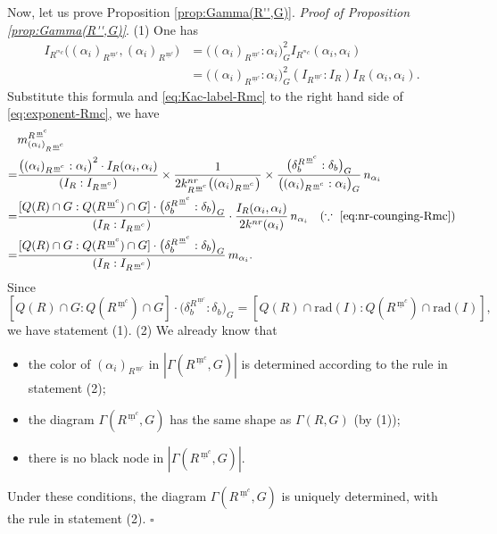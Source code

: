 \documentclass[11pt]{amsart}
\newcommand{\mc}{\, \underline{\mathrm{m}}^c}
\begin{document}
{Now, let us prove Proposition \ref{prop:Gamma(R'',G)}.
\vskip 3mm
\noindent
{\it Proof of Proposition \ref{prop:Gamma(R'',G)}}. 
(1) One has
\begin{align*}
I_{R^{^mc}}\big((\alpha_i)_{R^{\mc}},(\alpha_i)_{R^{\mc}}\big)
&=\big((\alpha_i)_{R^{\mc}}:\alpha_i\big)_G^2I_{R^{^mc}}(\alpha_i,\alpha_i)\\
&=\big((\alpha_i)_{R^{\mc}}:\alpha_i\big)_G^2(I_{R^{\mc}}:I_R)I_R(\alpha_i,\alpha_i).
\end{align*}
Substitute this formula and \eqref{eq:Kac-label-Rmc}
to the right hand side of \eqref{eq:exponent-Rmc}, we have
\begin{align*}
&m_{(\alpha_i)_{R^{\mc}}}^{R^{\mc}} \\
=
&\dfrac{\big((\alpha_i)_{R^{\mc}}:\alpha_i\big)^2 \cdot I_R(\alpha_i,\alpha_i)}
{(I_R:I_{R^{\mc}})}
\times 
\dfrac{1}{2k_{R^{\mc}}^{nr}\big((\alpha_i)_{R^{\mc}}\big)}
\times
\dfrac{\big(\delta_b^{R^{\mc}}:\delta_b\big)_G}
{\big((\alpha_i)_{R^{\mc}}:\alpha_i\big)_G}\, n_{\alpha_i}\\
=
&\dfrac{[Q(R)\cap G:Q(R^{\mc})\cap G]\cdot\big(\delta_b^{R^{\mc}}:\delta_b\big)_G}
{(I_R:I_{R^{\mc}})}\cdot
\dfrac{I_R(\alpha_i,\alpha_i)}
{2k^{nr}(\alpha_i)}\,n_{\alpha_i}\quad (\because \ \eqref{eq:nr-counging-Rmc})\\
=
&\dfrac{[Q(R)\cap G:Q(R^{\mc})\cap G]\cdot\big(\delta_b^{R^{\mc}}:\delta_b\big)_G}
{(I_R:I_{R^{\mc}})}\, m_{\alpha_i}.
\end{align*}
Since
\[ 
[Q(R)\cap G:Q(R^{\mc})\cap G]\cdot\big(\delta_b^{R^{\mc}}:\delta_b\big)_G
=[Q(R)\cap \mathrm{rad}(I):Q(R^{\mc})\cap \mathrm{rad}(I)], 
\] 
we have statement (1). 
\vskip 1mm
\noindent 
(2) We already know that 
\begin{itemize}
\item[(i)] the color of $(\alpha_i)_{R^{\mc}}$ in 
$|\Gamma(R^{\mc},G)|$ is determined according to the rule in  statement (2);
\item[(ii)] the diagram $\Gamma(R^{\mc},G)$ has the same shape as $\Gamma(R,G)$ 
(by (1));
\item[(iii)] there is no black node in $|\Gamma(R^{\mc},G)|$. 
\end{itemize}
Under these conditions, the diagram $\Gamma(R^{\mc},G)$ is uniquely determined, 
with the rule in  statement (2). 
\hfill $\square$

}
\end{document}
